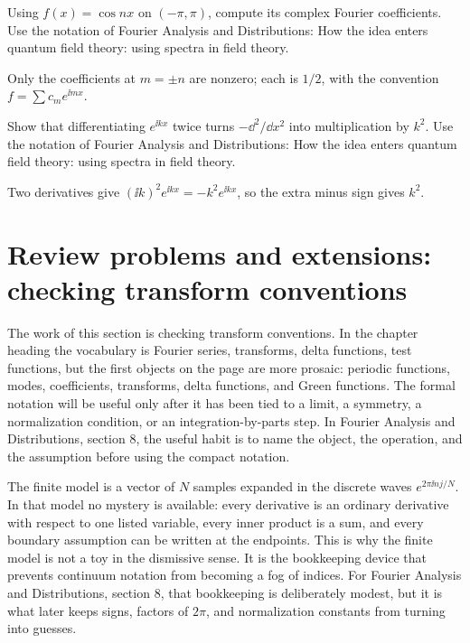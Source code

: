 \begin{exercise}
Using \(f(x)=\cos nx\) on \((-\pi,\pi)\), compute its complex Fourier coefficients.  Use the notation of Fourier Analysis and Distributions: How the idea enters quantum field theory: using spectra in field theory.
\begin{answer}
Only the coefficients at \(m=\pm n\) are nonzero; each is \(1/2\), with the convention \(f=\sum c_me^{\ii mx}\).
\end{answer}
\end{exercise}

\begin{exercise}
Show that differentiating \(e^{\ii kx}\) twice turns \(-\dd^2/\dd x^2\) into multiplication by \(k^2\).  Use the notation of Fourier Analysis and Distributions: How the idea enters quantum field theory: using spectra in field theory.
\begin{answer}
Two derivatives give \((\ii k)^2e^{\ii kx}=-k^2e^{\ii kx}\), so the extra minus sign gives \(k^2\).
\end{answer}
\end{exercise}



\section{Review problems and extensions: checking transform conventions}

The work of this section is checking transform conventions.  In the chapter heading the vocabulary is Fourier series, transforms, delta functions, test functions, but the first objects on the page are more prosaic: periodic functions, modes, coefficients, transforms, delta functions, and Green functions.  The formal notation will be useful only after it has been tied to a limit, a symmetry, a normalization condition, or an integration-by-parts step.  In Fourier Analysis and Distributions, section 8, the useful habit is to name the object, the operation, and the assumption before using the compact notation.

The finite model is a vector of \(N\) samples expanded in the discrete waves \(e^{2\pi \ii nj/N}\).  In that model no mystery is available: every derivative is an ordinary derivative with respect to one listed variable, every inner product is a sum, and every boundary assumption can be written at the endpoints.  This is why the finite model is not a toy in the dismissive sense.  It is the bookkeeping device that prevents continuum notation from becoming a fog of indices.  For Fourier Analysis and Distributions, section 8, that bookkeeping is deliberately modest, but it is what later keeps signs, factors of \(2\pi\), and normalization constants from turning into guesses.


